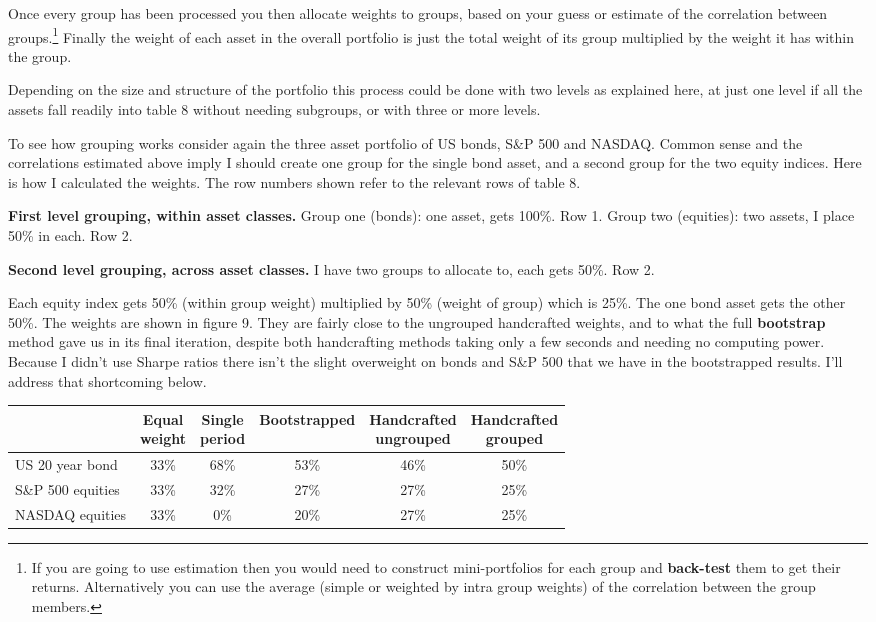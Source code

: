 Once every group has been processed you then allocate weights to groups, based on your guess or estimate of the correlation between groups.\footnote{If you are going to use estimation then you would need to construct mini-portfolios for each group and \textbf{back-test} them to get their returns. Alternatively you can use the average (simple or weighted by intra group weights) of the correlation between the group members.} Finally the weight of each asset in the overall portfolio is just the total weight of its group multiplied by the weight it has within the group.

Depending on the size and structure of the portfolio this process could be done with two levels as explained here, at just one level if all the assets fall readily into table 8 without needing subgroups, or with three or more levels.

To see how grouping works consider again the three asset portfolio of US bonds, S\&P 500 and NASDAQ. Common sense and the correlations estimated above imply I should create one group for the single bond asset, and a second group for the two equity indices. Here is how I calculated the weights. The row numbers shown refer to the relevant rows of table 8.

\medskip \noindent\textbf{First level grouping, within asset classes.} Group one (bonds): one asset, gets 100\%. Row 1. Group two (equities): two assets, I place 50\% in each. Row 2.

\medskip \noindent\textbf{Second level grouping, across asset classes.} I have two groups to allocate to, each gets 50\%. Row 2.

\medskip Each equity index gets 50\% (within group weight) multiplied by 50\% (weight of group) which is 25\%. The one bond asset gets the other 50\%. The weights are shown in figure 9. They are fairly close to the ungrouped handcrafted weights, and to what the full \textbf{bootstrap} method gave us in its final iteration, despite both handcrafting methods taking only a few seconds and needing no computing power. Because I didn’t use Sharpe ratios there isn’t the slight overweight on bonds and S\&P 500 that we have in the bootstrapped results. I’ll address that shortcoming below.


\begingroup 
\small 
\setlength{\tabcolsep}{3pt}
\centering 
\begin{tabular}{@{} lccccc@{}}
\toprule
& \shortstack{Equal\\weight} & \shortstack{Single\\period} & Bootstrapped & \shortstack{Handcrafted\\ungrouped} & \shortstack{Handcrafted\\grouped} \\
\midrule
US 20 year bond & 33\% & 68\% & 53\% & 46\% & 50\% \\
S\&P 500 equities & 33\% & 32\% & 27\% & 27\% & 25\% \\
NASDAQ equities & 33\% & 0\% & 20\% & 27\% & 25\% \\
\bottomrule
\end{tabular}
\par 
\endgroup

